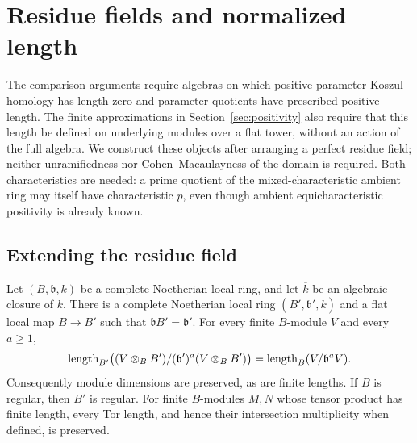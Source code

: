 \section{Residue fields and normalized length}\label{sec:lengths}

The comparison arguments require algebras on which positive parameter
Koszul homology has length zero and parameter quotients have prescribed
positive length.  The finite approximations in Section~\ref{sec:positivity}
also require that this length be defined on underlying modules over a
flat tower, without an action of the full algebra.  We construct these
objects after arranging a perfect residue field; neither unramifiedness
nor Cohen--Macaulayness of the domain is required.
Both characteristics are needed: a prime quotient of the
mixed-characteristic ambient ring may itself have characteristic $p$,
even though ambient equicharacteristic positivity is already known.

\subsection{Extending the residue field}

\begin{lemma}\label{len:residue-extension}
Let $(B,\mathfrak b,k)$ be a complete Noetherian local ring, and let
$\overline{k}$ be an algebraic closure of $k$.  There is a complete
Noetherian local ring $(B',\mathfrak b',\overline{k})$ and a flat local map
$B\to B'$ such that $\mathfrak bB'=\mathfrak b'$.
For every finite $B$-module $V$ and every $a\geq1$,
\[
 \operatorname{length}_{B'}\bigl((V\otimes_B B')/(\mathfrak b')^a
                          (V\otimes_B B')\bigr)
       =\operatorname{length}_B(V/\mathfrak b^aV).
\]
Consequently module dimensions are preserved, as are finite lengths.
If $B$ is regular, then $B'$ is regular.  For finite $B$-modules $M,N$
whose tensor product has finite length, every Tor length, and hence
their intersection multiplicity when defined, is preserved.
\end{lemma}


